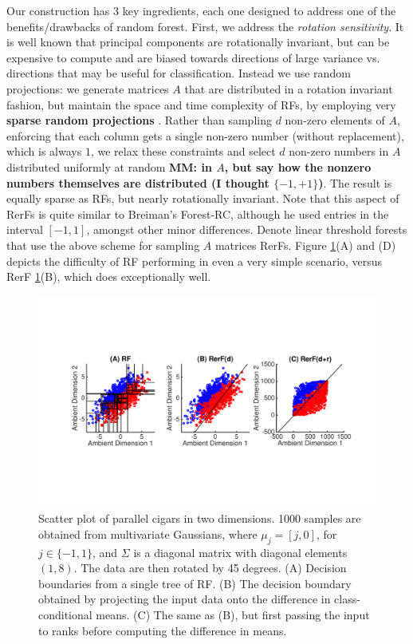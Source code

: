 \documentclass{article} %
\begin{document}
Our construction has $3$ key ingredients, each one designed to address one of the benefits/drawbacks of random forest.
First, we address the {\em{rotation sensitivity}}.  It is well known that principal components are rotationally invariant, but can be expensive to compute and are biased towards directions of large variance vs. directions that may be useful for classification. Instead we use random projections: we generate matrices $A$ that are distributed in a rotation invariant fashion, but maintain the space and time complexity of RFs, by employing very {\bf{sparse random projections}} \cite{Li2006}.  Rather than sampling $d$ non-zero elements of $A$, enforcing that each column gets a single non-zero number (without replacement), which is always $1$, we relax these constraints and select $d$ non-zero numbers in $A$ distributed uniformly at random {\bf{MM: in $A$, but say how the nonzero numbers themselves are distributed (I thought $\{-1,+1\}$)}}.  The result is equally sparse as RFs, but nearly rotationally invariant.  Note that this aspect of RerFs is quite similar to Breiman's Forest-RC, although he used entries in the interval $[-1,1]$, amongst other minor differences. Denote linear threshold forests that use the above scheme for sampling $A$ matrices RerFs.  Figure \ref{fig:cigars}(A) and (D) depicts the difficulty of RF performing in even a very simple scenario, versus RerF \ref{fig:cigars}(B), which does exceptionally well.


\begin{figure}[h]
\begin{center}
\includegraphics[trim=0in 3.2in 0in 3in, clip=true, width=\linewidth]{../Figures/pdf/Cigars}
\end{center}
\caption{Scatter plot of parallel cigars in two dimensions. 1000 samples are obtained from multivariate Gaussians, where $\mu_j=[j, 0]$, for $j \in \{-1,1\}$, and $\Sigma$ is a diagonal matrix with diagonal elements $(1,8)$.  The data are then rotated by 45 degrees. (A) Decision boundaries from a single tree of RF. (B) The decision boundary obtained by projecting the input data onto the difference in class-conditional means. (C) The same as (B), but first passing the input to ranks before computing the difference in means.}
\label{fig:cigars}
\end{figure}
\end{document}
